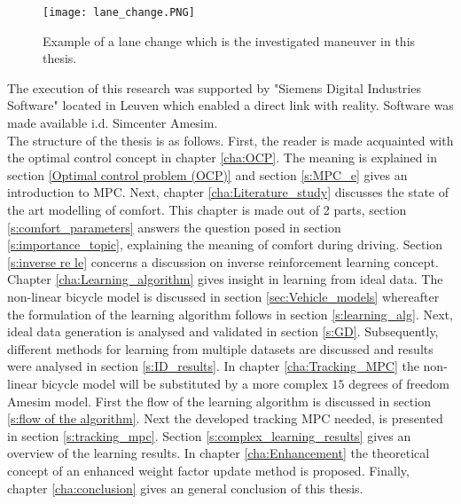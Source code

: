 \begin{figure}[htp]
	\centering
	\texttt{[image: lane\_change.PNG]}
	\caption{Example of a lane change which is the investigated maneuver in this thesis.}
	\label{fig:lane_change}
\end{figure}

The execution of this research was supported by "Siemens Digital Industries Software" located in Leuven which enabled a direct link with reality. Software was made available i.d. Simcenter Amesim.\\

The structure of the thesis is as follows. First, the reader is made acquainted with the optimal control concept in chapter \ref{cha:OCP}. The meaning is explained in section \ref{Optimal control problem (OCP)} and section \ref{s:MPC_e} gives an introduction to MPC. Next, chapter \ref{cha:Literature_study} discusses the state of the art modelling of comfort. This chapter is made out of 2 parts, section \ref{s:comfort_parameters} answers the question posed in section \ref{s:importance_topic}, explaining the meaning of comfort during driving. Section \ref{s:inverse re le} concerns a discussion on inverse reinforcement learning concept. Chapter \ref{cha:Learning_algorithm} gives insight in learning from ideal data. The non-linear bicycle model is discussed in section \ref{sec:Vehicle_models} whereafter the formulation of the learning algorithm follows in section \ref{s:learning_alg}. Next, ideal data generation is analysed and validated in section \ref{s:GD}. Subsequently, different methods for learning from multiple datasets are discussed and results were analysed in section \ref{s:ID_results}. In chapter \ref{cha:Tracking_MPC} the non-linear bicycle model will be substituted by a more complex $15$ degrees of freedom Amesim model. First the flow of the learning algorithm is discussed in section \ref{s:flow of the algorithm}. Next the developed tracking MPC needed, is presented in section \ref{s:tracking_mpc}. Section \ref{s:complex_learning_results} gives an overview of the learning results. 
In chapter \ref{cha:Enhancement} the theoretical concept of an enhanced weight factor update method is proposed. Finally, chapter \ref{cha:conclusion} gives an general conclusion of this thesis.\\


